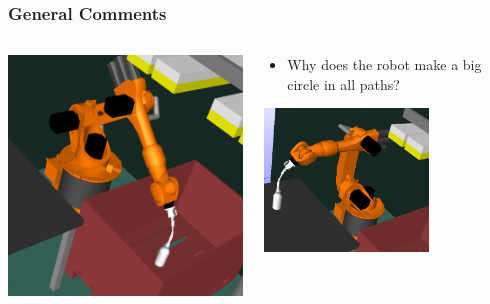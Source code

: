 \documentclass{beamer}
\begin{document}
\begin{frame}
  \frametitle{General Comments}
  \begin{columns}
    \begin{column}{0.4\textwidth}
      \begin{center}
        \includegraphics[width=\textwidth]{./pick}
      \end{center}
    \end{column}
    \begin{column}{0.6\textwidth}
      \begin{itemize}
      \item Why does the robot make a big circle in all paths?
      \end{itemize}
      \begin{center}
        \includegraphics[width=0.6666\textwidth]{./place}
      \end{center}
    \end{column}
  \end{columns}
\end{frame}
\end{document}
